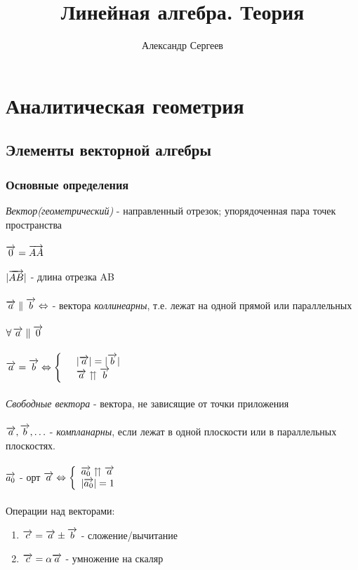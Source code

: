 \documentclass[12pt]{article}
\title{Линейная алгебра. Теория}
\author{Александр Сергеев}
\date{}
\begin{document}
\maketitle
\section{Аналитическая геометрия}
\subsection{Элементы векторной алгебры}
\subsubsection{Основные определения}
\textit{Вектор(геометрический)} - направленный отрезок; упорядоченная пара точек пространства\\\\
$\overrightarrow{0} = \overrightarrow{AA}$\\\\
$|\overrightarrow{AB}|$ - длина отрезка AB\\\\
$\overrightarrow{a}\parallel\overrightarrow{b} \Leftrightarrow$ - вектора \textit{коллинеарны}, т.е. лежат на одной прямой или параллельных\\\\
$\forall\,\overrightarrow{a}\parallel\overrightarrow{0}$\\\\
$\overrightarrow{a} = \overrightarrow{b} \Leftrightarrow \left\{\begin{array}{ll}
     & |\overrightarrow{a}| = |\overrightarrow{b}| \\
     & \overrightarrow{a}\upuparrows\overrightarrow{b}
\end{array}\right.$\\\\
\textit{Свободные вектора} - вектора, не зависящие от точки приложения\\\\
$\overrightarrow{a}, \overrightarrow{b}, \ldots$ - \textit{компланарны}, если лежат в одной плоскости или в параллельных плоскостях.\\\\
$\overrightarrow{a_0}$ - орт $\overrightarrow{a} \Leftrightarrow \left\{\begin{array}{l}
     \overrightarrow{a_0} \upuparrows \overrightarrow{a} \\
     |\overrightarrow{a_0}| = 1
\end{array}\right.$\\\\
Операции над векторами:
\begin{enumerate}
    \item $\overrightarrow{c} = \overrightarrow{a}\pm\overrightarrow{b}$ - сложение/вычитание
    \item $\overrightarrow{c} = \alpha\overrightarrow{a}$ - умножение на скаляр
\end{enumerate}
\end{document}
